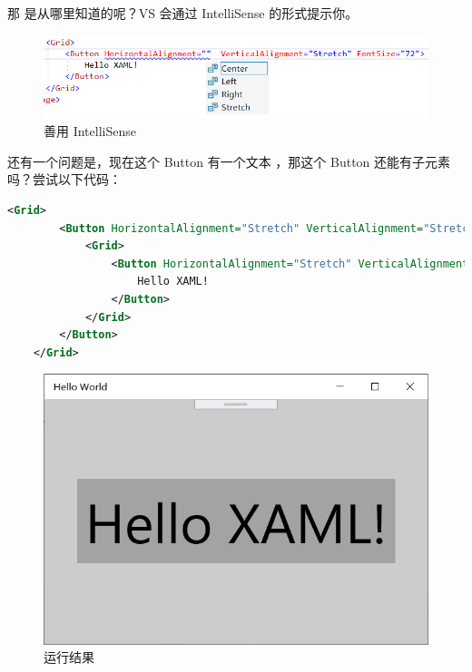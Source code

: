 那  是从哪里知道的呢？VS 会通过 IntelliSense 的形式提示你。
\begin{figure}[htbp]
    \centering
    \includegraphics[width = 0.75\paperwidth]{pic/17.png}
    \caption{善用 IntelliSense}
\end{figure}

还有一个问题是，现在这个 Button 有一个文本 ，那这个 Button 还能有子元素吗？尝试以下代码：
\begin{lstlisting}[language = xml]
    <Grid>
        <Button HorizontalAlignment="Stretch" VerticalAlignment="Stretch" FontSize="72">
            <Grid>
                <Button HorizontalAlignment="Stretch" VerticalAlignment="Stretch" FontSize="72">
                    Hello XAML!
                </Button>
            </Grid>
        </Button>
    </Grid>
\end{lstlisting}
\begin{figure}[htbp]
    \centering
    \includegraphics[width = 0.5\paperwidth]{pic/18.png}
    \caption{运行结果}
\end{figure}

